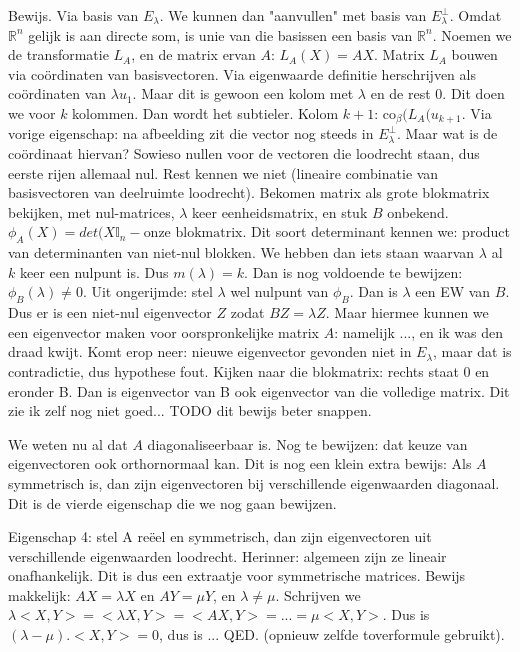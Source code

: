 \documentclass{article}
\begin{document}
Bewijs. Via basis van $E_\lambda$. We kunnen dan "aanvullen" met basis van $E_\lambda^{\perp}$. Omdat $\mathbb{R}^n$ gelijk is aan directe som, is unie van die basissen een basis van $\mathbb{R}^n$. 
Noemen we de transformatie $L_A$, en de matrix ervan $A$: $L_A(X)=AX$. Matrix $L_A$ bouwen via co\"ordinaten van basisvectoren. Via eigenwaarde definitie herschrijven als co\"ordinaten van $\lambda u_1$. Maar dit is gewoon een kolom met $\lambda$ en de rest $0$. Dit doen we voor $k$ kolommen. 
Dan wordt het subtieler. Kolom $k+1$: co$_\beta(L_A(u_{k+1}$. Via vorige eigenschap: na afbeelding zit die vector nog steeds in $E_\lambda^\perp$. Maar wat is de co\"ordinaat hiervan? Sowieso nullen voor de vectoren die loodrecht staan, dus eerste rijen allemaal nul. Rest kennen we niet (lineaire combinatie van basisvectoren van deelruimte loodrecht).  
Bekomen matrix als grote blokmatrix bekijken, met nul-matrices, $\lambda$ keer eenheidsmatrix, en stuk $B$ onbekend. 
$\phi_A(X) = det(X \mathbb{I}_n - \text{onze blokmatrix} $. Dit soort determinant kennen we: product van determinanten van niet-nul blokken. We hebben dan iets staan waarvan $\lambda$ al $k$ keer een nulpunt is. Dus $m(\lambda)=k$. 
Dan is nog voldoende te bewijzen: $\phi_B(\lambda) \neq 0$. 
Uit ongerijmde: stel $\lambda$ wel nulpunt van $\phi_B$. Dan is $\lambda$ een EW van $B$. Dus er is een niet-nul eigenvector $Z$ zodat $BZ=\lambda Z$. Maar hiermee kunnen we een eigenvector maken voor oorspronkelijke matrix $A$: namelijk ..., en ik was den draad kwijt. Komt erop neer: nieuwe eigenvector gevonden niet in $E_\lambda$, maar dat is contradictie, dus hypothese fout. 
Kijken naar die blokmatrix: rechts staat 0 en eronder B. Dan is eigenvector van B ook eigenvector van die volledige matrix. Dit zie ik zelf nog niet goed... TODO dit bewijs beter snappen. 

We weten nu al dat $A$ diagonaliseerbaar is. 
Nog te bewijzen: dat keuze van eigenvectoren ook orthornormaal kan. 
Dit is nog een klein extra bewijs: 
Als $A$ symmetrisch is, dan zijn eigenvectoren bij verschillende eigenwaarden diagonaal. Dit is de vierde eigenschap die we nog gaan bewijzen. 

Eigenschap 4: stel A re\"eel en symmetrisch, dan zijn eigenvectoren uit verschillende eigenwaarden loodrecht. 
Herinner: algemeen zijn ze lineair onafhankelijk. Dit is dus een extraatje voor symmetrische matrices. 
Bewijs makkelijk: $AX=\lambda X$ en $AY=\mu Y$, en $\lambda \neq \mu$. 
Schrijven we $\lambda<X,Y> = <\lambda X, Y> = <AX, Y> = ... = \mu <X,Y>$. Dus is $(\lambda - \mu) . <X,Y> = 0$, dus is ... QED. 
(opnieuw zelfde toverformule gebruikt). 
\end{document}
